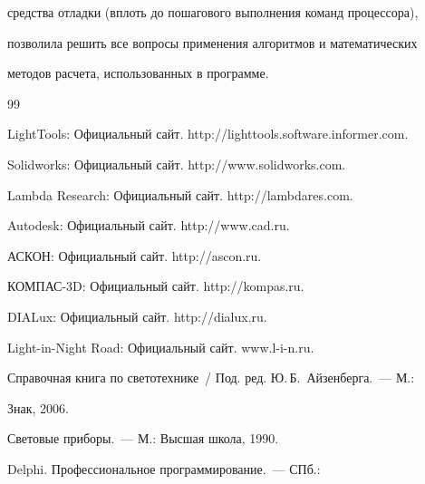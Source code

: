 средства отладки (вплоть до пошагового выполнения команд процессора), 


позволила решить все вопросы применения алгоритмов и математических 


методов расчета, использованных в программе.





{\small\frenchspacing


{%




\begin{thebibliography}{99}


  




LightTools: Официальный сайт. {\sf http://lighttools.software.informer.com}.




Solidworks: Официальный сайт. {\sf http://www.solidworks.com}.




Lambda Research: Официальный сайт. {\sf http://lambdares.com}.




Autodesk: Официальный сайт. {\sf http://www.cad.ru}.




АСКОН: Официальный сайт. {\sf http://ascon.ru}.




КОМПАС-3D: Официальный сайт. {\sf http://kompas.ru}.




DIALux: Официальный сайт. {\sf http://dialux.ru}.




Light-in-Night Road: Официальный сайт. {\sf www.l-i-n.ru}.




Справочная книга по светотехнике~/ Под. ред. Ю.\,Б.~Айзенберга.~--- М.: 


Знак, 2006.




 Световые приборы.~--- М.: Высшая школа, 1990.




 Delphi. Профессиональное программирование.~--- СПб.: 



\end{thebibliography}}}
